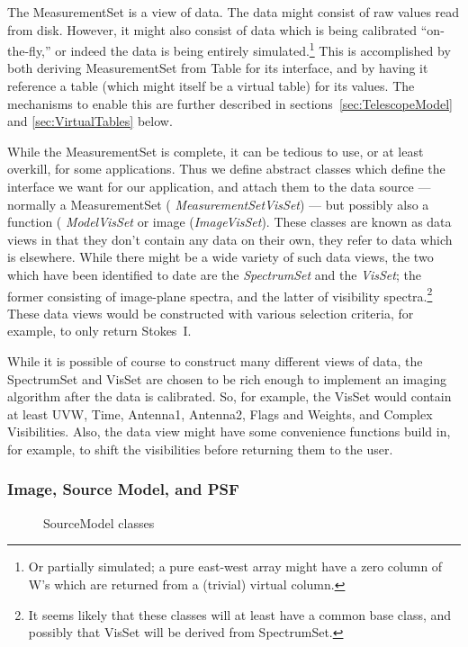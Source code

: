 The MeasurementSet is a view of data. The data might consist of raw
values read from disk. However, it might also consist of data which is
being calibrated ``on-the-fly,'' or indeed the data is being entirely
simulated.\footnote{Or partially simulated; a pure east-west array
might have a zero column of W's which are returned from a (trivial)
virtual column.}  This is accomplished by both deriving MeasurementSet
from Table for its interface, and by having it reference a table
(which might itself be a virtual table) for its values.  The
mechanisms to enable this are further described in
sections~\ref{sec:TelescopeModel} and \ref{sec:VirtualTables} below.


While the MeasurementSet is complete, it can be tedious to use, or at
least overkill, for some applications. Thus we define abstract classes
which define the interface we want for our application, and attach
them to the data source --- normally a MeasurementSet ({\em
MeasurementSetVisSet}) --- but possibly also a function ({\em
ModelVisSet} or image ({\em ImageVisSet}). These classes are known as
data views in that they don't contain any data on their own, they
refer to data which is elsewhere. While there might be a wide variety
of such data views, the two which have been identified to date are the
{\em SpectrumSet} and the {\em VisSet}; the former consisting of
image-plane spectra, and the latter of visibility spectra.\footnote{It
seems likely that these classes will at least have a common base
class, and possibly that VisSet will be derived from SpectrumSet.}
These data views would be constructed with various selection criteria,
for example, to only return Stokes~I.

While it is possible of course to construct many different views of
data, the SpectrumSet and VisSet are chosen to be rich enough to
implement an imaging algorithm after the data is calibrated. So, for
example, the VisSet would contain at least UVW, Time, Antenna1,
Antenna2, Flags and Weights, and Complex Visibilities. Also, the data
view might have some convenience functions build in, for example, to
shift the visibilities before returning them to the user.

\subsubsection{Image, Source Model, and PSF}

\begin{figure}
\epsfverbosetrue
\epsfysize=5.5in
\caption{SourceModel classes}
\label{fig:sm}
\end{figure}


